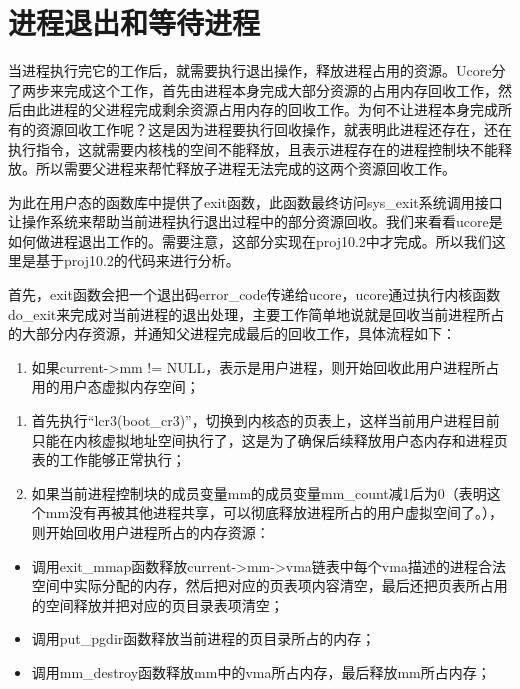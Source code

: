 \section{进程退出和等待进程}\label{ux8fdbux7a0bux9000ux51faux548cux7b49ux5f85ux8fdbux7a0b}

当进程执行完它的工作后，就需要执行退出操作，释放进程占用的资源。Ucore分了两步来完成这个工作，首先由进程本身完成大部分资源的占用内存回收工作，然后由此进程的父进程完成剩余资源占用内存的回收工作。为何不让进程本身完成所有的资源回收工作呢？这是因为进程要执行回收操作，就表明此进程还存在，还在执行指令，这就需要内核栈的空间不能释放，且表示进程存在的进程控制块不能释放。所以需要父进程来帮忙释放子进程无法完成的这两个资源回收工作。

为此在用户态的函数库中提供了exit函数，此函数最终访问sys\_exit系统调用接口让操作系统来帮助当前进程执行退出过程中的部分资源回收。我们来看看ucore是如何做进程退出工作的。需要注意，这部分实现在proj10.2中才完成。所以我们这里是基于proj10.2的代码来进行分析。

首先，exit函数会把一个退出码error\_code传递给ucore，ucore通过执行内核函数do\_exit来完成对当前进程的退出处理，主要工作简单地说就是回收当前进程所占的大部分内存资源，并通知父进程完成最后的回收工作，具体流程如下：

\begin{enumerate}
\def\labelenumi{\arabic{enumi}.}
\item
  如果current-\textgreater{}mm !=
  NULL，表示是用户进程，则开始回收此用户进程所占用的用户态虚拟内存空间；
\end{enumerate}

\begin{enumerate}
\def\labelenumi{\alph{enumi}.}
\item
  首先执行``lcr3(boot\_cr3)''，切换到内核态的页表上，这样当前用户进程目前只能在内核虚拟地址空间执行了，这是为了确保后续释放用户态内存和进程页表的工作能够正常执行；
\item
  如果当前进程控制块的成员变量mm的成员变量mm\_count减1后为0（表明这个mm没有再被其他进程共享，可以彻底释放进程所占的用户虚拟空间了。），则开始回收用户进程所占的内存资源：
\end{enumerate}

\begin{itemize}
\item
  调用exit\_mmap函数释放current-\textgreater{}mm-\textgreater{}vma链表中每个vma描述的进程合法空间中实际分配的内存，然后把对应的页表项内容清空，最后还把页表所占用的空间释放并把对应的页目录表项清空；
\item
  调用put\_pgdir函数释放当前进程的页目录所占的内存；
\item
  调用mm\_destroy函数释放mm中的vma所占内存，最后释放mm所占内存；
\end{itemize}

